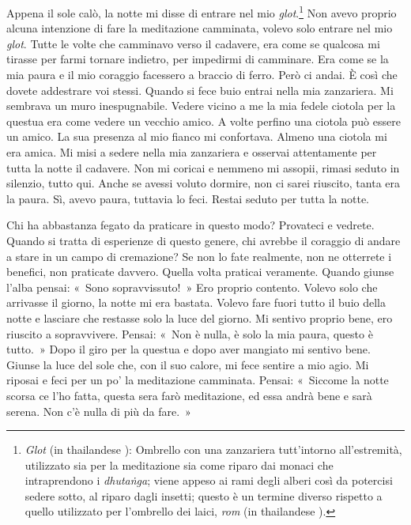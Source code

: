 Appena il sole calò, la notte mi disse di entrare nel mio
\emph{glot}.\footnote{\emph{Glot} (in thailandese ): Ombrello con una
  zanzariera tutt'intorno all'estremità, utilizzato sia per la
  meditazione sia come riparo dai monaci che intraprendono i
  \emph{dhutaṅga}; viene appeso ai rami degli alberi così da potercisi
  sedere sotto, al riparo dagli insetti; questo è un termine diverso
  rispetto a quello utilizzato per l'ombrello dei laici, \emph{rom} (in
  thailandese ).} Non avevo proprio alcuna intenzione di fare la
meditazione camminata, volevo solo entrare nel mio \emph{glot}. Tutte le
volte che camminavo verso il cadavere, era come se qualcosa mi tirasse
per farmi tornare indietro, per impedirmi di camminare. Era come se la
mia paura e il mio coraggio facessero a braccio di ferro. Però ci andai.
È così che dovete addestrare voi stessi. Quando si fece buio entrai
nella mia zanzariera. Mi sembrava un muro inespugnabile. Vedere vicino a
me la mia fedele ciotola per la questua era come vedere un vecchio
amico. A volte perfino una ciotola può essere un amico. La sua presenza
al mio fianco mi confortava. Almeno una ciotola mi era amica. Mi misi a
sedere nella mia zanzariera e osservai attentamente per tutta la notte
il cadavere. Non mi coricai e nemmeno mi assopii, rimasi seduto in
silenzio, tutto qui. Anche se avessi voluto dormire, non ci sarei
riuscito, tanta era la paura. Sì, avevo paura, tuttavia lo feci. Restai
seduto per tutta la notte.

Chi ha abbastanza fegato da praticare in questo modo? Provateci e
vedrete. Quando si tratta di esperienze di questo genere, chi avrebbe il
coraggio di andare a stare in un campo di cremazione? Se non lo fate
realmente, non ne otterrete i benefici, non praticate davvero. Quella
volta praticai veramente. Quando giunse l'alba pensai: «~Sono
sopravvissuto!~» Ero proprio contento. Volevo solo che arrivasse il
giorno, la notte mi era bastata. Volevo fare fuori tutto il buio della
notte e lasciare che restasse solo la luce del giorno. Mi sentivo
proprio bene, ero riuscito a sopravvivere. Pensai: «~Non è nulla, è solo
la mia paura, questo è tutto.~» Dopo il giro per la questua e dopo aver
mangiato mi sentivo bene. Giunse la luce del sole che, con il suo
calore, mi fece sentire a mio agio. Mi riposai e feci per un po' la
meditazione camminata. Pensai: «~Siccome la notte scorsa ce l'ho fatta,
questa sera farò meditazione, ed essa andrà bene e sarà serena. Non c'è
nulla di più da fare.~»

